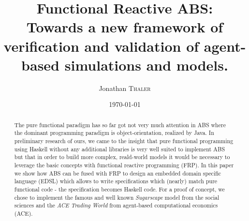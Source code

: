 \documentclass[twocolumn]{article}
\title{Functional Reactive ABS:\\Towards a new framework of verification and validation of agent-based simulations and models.} %
\author{Jonathan \textsc{Thaler}} %
\date{\today} %
\begin{document}
\maketitle %

\begin{abstract}
The pure functional paradigm has so far got not very much attention in ABS where the dominant programming paradigm is object-orientation, realized by Java. In preliminary research of ours, we came to the insight that pure functional programming using Haskell without any additional libraries is very well suited to implement ABS but that in order to build more complex, reald-world models it would be necessary to leverage the basic concepts with functional reactive programming (FRP). In this paper we show how ABS can be fused with FRP to design an embedded domain specific language (EDSL) which allows to write specifications which (nearly) match pure functional code - the specification becomes Haskell code. For a proof of concept, we chose to implement the famous and well known \textit{Sugarscape} model from the social sciences and the \textit{ACE Trading World} from agent-based computational economics (ACE).
\end{abstract}













\end{document}
